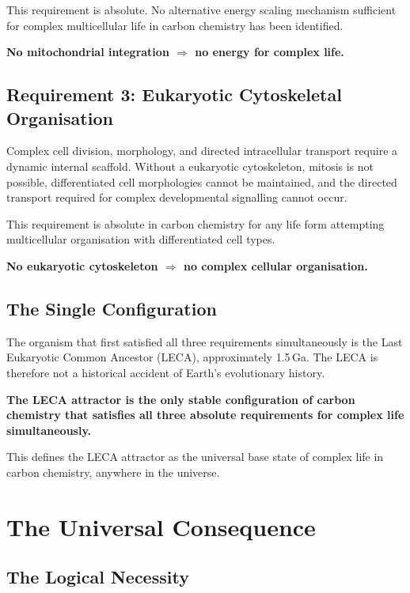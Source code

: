 \documentclass[11pt, a4paper]{article}
\begin{document}
This requirement is absolute. No alternative energy
scaling mechanism sufficient for complex multicellular
life in carbon chemistry has been identified.

\textbf{No mitochondrial integration
$\Rightarrow$ no energy for complex life.}

\subsection{Requirement 3: Eukaryotic Cytoskeletal
Organisation}

Complex cell division, morphology, and directed
intracellular transport require a dynamic internal
scaffold. Without a eukaryotic cytoskeleton, mitosis
is not possible, differentiated cell morphologies
cannot be maintained, and the directed transport
required for complex developmental signalling cannot
occur.

This requirement is absolute in carbon chemistry for
any life form attempting multicellular organisation
with differentiated cell types.

\textbf{No eukaryotic cytoskeleton
$\Rightarrow$ no complex cellular organisation.}

\subsection{The Single Configuration}

The organism that first satisfied all three requirements
simultaneously is the Last Eukaryotic Common Ancestor
(LECA), approximately 1.5\,Ga. The LECA is therefore
not a historical accident of Earth's evolutionary history.

\textbf{The LECA attractor is the only stable
configuration of carbon chemistry that satisfies all
three absolute requirements for complex life
simultaneously.}

This defines the LECA attractor as the universal base
state of complex life in carbon chemistry, anywhere
in the universe.

\section{The Universal Consequence}

\subsection{The Logical Necessity}
\end{document}
